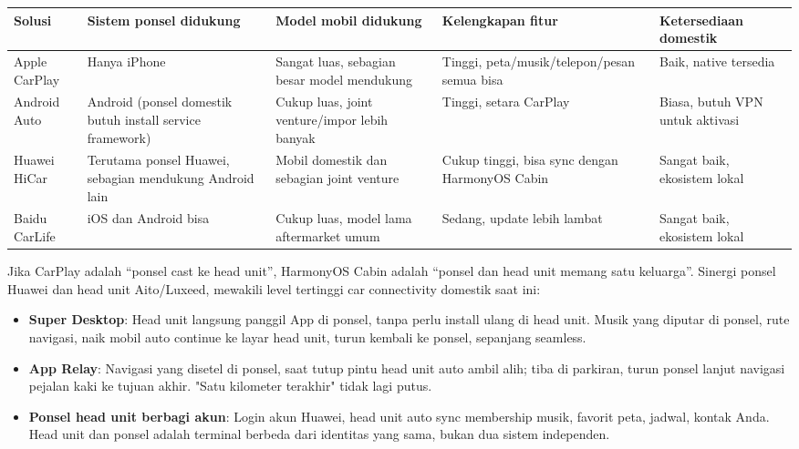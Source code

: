 \begin{center}
\begin{tabularx}{\linewidth}{|X|X|X|X|X|}
\hline
\textbf{Solusi} & \textbf{Sistem ponsel didukung} & \textbf{Model mobil didukung} & \textbf{Kelengkapan fitur} & \textbf{Ketersediaan domestik} \tabularnewline
\hline
Apple CarPlay & Hanya iPhone & Sangat luas, sebagian besar model mendukung & Tinggi, peta/musik/telepon/pesan semua bisa & Baik, native tersedia \tabularnewline
Android Auto & Android (ponsel domestik butuh install service framework) & Cukup luas, joint venture/impor lebih banyak & Tinggi, setara CarPlay & Biasa, butuh VPN untuk aktivasi \tabularnewline
Huawei HiCar & Terutama ponsel Huawei, sebagian mendukung Android lain & Mobil domestik dan sebagian joint venture & Cukup tinggi, bisa sync dengan HarmonyOS Cabin & Sangat baik, ekosistem lokal \tabularnewline
Baidu CarLife & iOS dan Android bisa & Cukup luas, model lama aftermarket umum & Sedang, update lebih lambat & Sangat baik, ekosistem lokal \tabularnewline
\hline
\end{tabularx}
\end{center}


Jika CarPlay adalah “ponsel cast ke head unit”, HarmonyOS Cabin adalah “ponsel dan head unit memang satu keluarga”. Sinergi ponsel Huawei dan head unit Aito/Luxeed, mewakili level tertinggi car connectivity domestik saat ini:

\begin{itemize}
  \item \textbf{Super Desktop}: Head unit langsung panggil App di ponsel, tanpa perlu install ulang di head unit. Musik yang diputar di ponsel, rute navigasi, naik mobil auto continue ke layar head unit, turun kembali ke ponsel, sepanjang seamless.
  \item \textbf{App Relay}: Navigasi yang disetel di ponsel, saat tutup pintu head unit auto ambil alih; tiba di parkiran, turun ponsel lanjut navigasi pejalan kaki ke tujuan akhir. "Satu kilometer terakhir" tidak lagi putus.
  \item \textbf{Ponsel head unit berbagi akun}: Login akun Huawei, head unit auto sync membership musik, favorit peta, jadwal, kontak Anda. Head unit dan ponsel adalah terminal berbeda dari identitas yang sama, bukan dua sistem independen.
\end{itemize}



